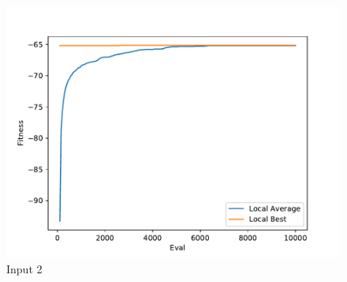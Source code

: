 \documentclass{standalone}
\begin{document}
\begin{figure}[!htb]
	\caption{Input 2}
	\label{fig:graph_2017}
	\includegraphics[width=\textwidth]{../graphs/graphs/2017.pdf}
\end{figure}
\end{document}
